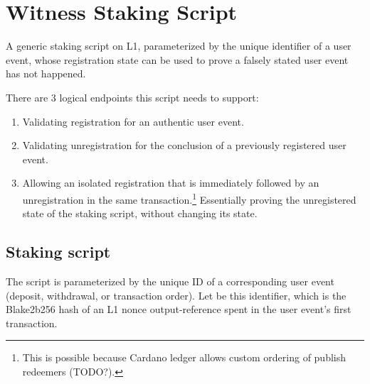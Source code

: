 \documentclass[../midgard.tex]{subfiles}
\begin{document}
\section{Witness Staking Script}
\label{h:witness}

A generic staking script on L1, parameterized by the unique identifier of a user event, whose registration state can be used to prove a falsely stated user event has not happened.

There are 3 logical endpoints this script needs to support:
\begin{enumerate}
    \item Validating registration for an authentic user event.
    \item Validating unregistration for the conclusion of a previously registered user event.
    \item Allowing an isolated registration that is immediately followed by an unregistration in the same transaction.\footnote{This is possible because Cardano ledger allows custom ordering of publish redeemers (TODO?).}
      Essentially proving the unregistered state of the staking script, without changing its state.
\end{enumerate}

\subsection{Staking script}
\label{h:witness-staking-script}
The  script is parameterized by the unique ID of a corresponding user event (deposit, withdrawal, or transaction order).
Let  be this identifier, which is the Blake2b256 hash of an L1 nonce output-reference spent in the user event's first transaction.
\end{document}
